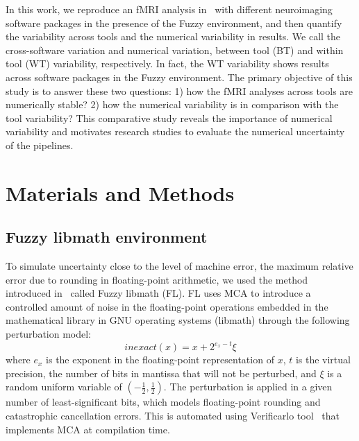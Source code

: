 \documentclass[conference]{IEEEtran}
\begin{document}
In this work, we reproduce an fMRI analysis in~\cite{bowring2019exploring} with different neuroimaging software packages in the presence of the Fuzzy environment,
and then quantify the variability across tools and the numerical variability in results.
We call the cross-software variation and numerical variation, between tool (BT) and within tool (WT) variability, respectively.
In fact, the WT variability shows results across software packages in the Fuzzy environment.
The primary objective of this study is to answer these two questions: 1) how the fMRI analyses across tools are numerically stable?
2) how the numerical variability is in comparison with the tool variability?
This comparative study reveals the importance of numerical variability and motivates research studies to evaluate the numerical uncertainty of the pipelines.



\section{Materials and Methods}

\subsection{Fuzzy libmath environment}

To simulate uncertainty close to the level of machine error,
the maximum relative error due to rounding in floating-point arithmetic,
we used the method introduced in~\cite{salari2021accurate}
called Fuzzy libmath (FL). FL uses MCA to
introduce a controlled amount of noise in the floating-point operations embedded
in the mathematical library in GNU operating systems (libmath)
through the following perturbation model:
\begin{equation} \label{eq:mca_inexact}
  inexact(x) = x + 2^{e_x-t}\xi
\end{equation}
where $e_x$ is the exponent in the floating-point representation of $x$,
$t$ is the virtual precision, the number of bits in mantissa that will not be perturbed,
and $\xi$ is a random uniform variable of $(-\frac{1}{2}, \frac{1}{2})$.
The perturbation is applied in a given number of least-significant bits,
which models floating-point rounding and catastrophic cancellation errors.
This is automated using Verificarlo tool~\cite{denis2015verificarlo} that implements MCA at compilation time.
\end{document}
